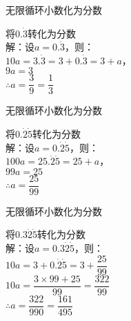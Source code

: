 \documentclass[aspectratio=169]{ctexbeamer} %
\author{致慧星空工作室}
\date{\today}
\begin{document}
\begin{frame}[t]{无限循环小数化为分数}
\begin{spacing}{2} %
\large
将$0.\dot 3$转化为分数\\
解：设$a=0.\dot 3$，则：\\
$10a = 3.\dot3 = 3 + 0.\dot3 = 3 + a$， \\
$9a = 3$ \\
$\therefore a = \dfrac{3}{9} = \dfrac{1}{3}$  \\
\end{spacing}
\end{frame}

\begin{frame}[t]{无限循环小数化为分数}
\begin{spacing}{2} %
\large
将$0.\dot 2 \dot 5$转化为分数\\
解：设$a=0.\dot 2 \dot 5$，则：\\
$100a = 25.\dot 2 \dot 5 = 25 + a$， \\
$99a = 25$ \\
$\therefore a = \dfrac{25}{99}$ \\
\end{spacing}
\end{frame}

\begin{frame}[t]{无限循环小数化为分数}
\begin{spacing}{2} %
\large
将$0.3\dot 2 \dot 5$转化为分数\\
解：设$a = 0.3\dot 2 \dot 5$，则：\\
$10a = 3 + 0.\dot 2 \dot 5 = 3 + \dfrac{25}{99}$ \\
$10a = \dfrac{3 \times 99 + 25}{99} = \dfrac{322}{99}$ \\
$\therefore a = \dfrac{322}{990} = \dfrac{161}{495}$ \\
\end{spacing}
\end{frame}
\end{document}
